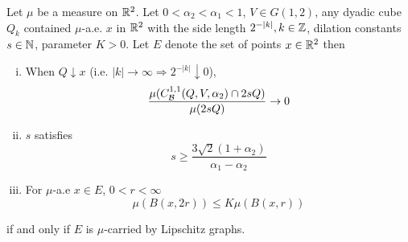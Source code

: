 \begin{lemma}
    Let $\mu$ be a measure on $\mathbb{R}^2$. Let $0<\alpha_2<\alpha_1<1$, $V\in G(1,2)$, any dyadic cube $Q_k$ contained $\mu$-a.e. $x$ in $\mathbb{R}^2$ with the side length $2^{-|k|}, k\in\mathbb{Z}$, dilation constants $s\in\mathbb{N}$, parameter $K>0$. Let $E$ denote the set of points $x\in\mathbb{R}^2$ then
    \begin{enumerate}[(i)]
        \item \label{lemmq-1:limQ-2sQ-0} When $Q\downarrow x$ (i.e. $|k|\rightarrow\infty \Rightarrow 2^{-|k|}\downarrow 0$),
        \begin{equation}
            \frac{\mu(C_\mathcal B^{1,1}(Q, V, \alpha_2)\cap 2sQ)}{\mu(2sQ)} \rightarrow 0
        \end{equation}
        \item \label{lemmq-2:limQ-2sQ-0} $s$ satisfies
        \begin{equation}  
            s \geq \frac{3\sqrt{2}(1+\alpha_2)}{\alpha_1-\alpha_2}
        \end{equation}
        \item \label{lemmq-3:limQ-2sQ-0} For $\mu$-a.e $x\in E$, $0<r<\infty$
        \begin{equation}
            \mu(B(x, 2r))\leq K\mu(B(x,r))
        \end{equation}
    \end{enumerate}
    if and only if $E$ is $\mu$-carried by Lipschitz graphs.
\end{lemma}
